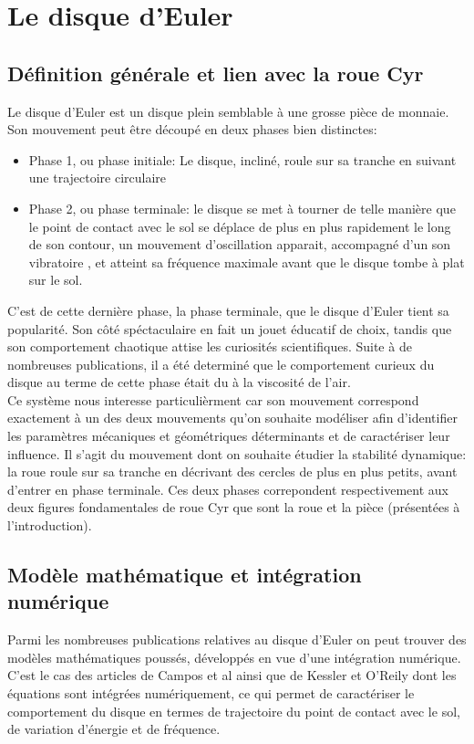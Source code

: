 \label{sec:RevLitt}

\section{Le disque d'Euler}
\subsection{Définition générale et lien avec la roue Cyr}
Le disque d'Euler est un disque plein semblable à une grosse pièce de monnaie. Son mouvement peut être découpé en deux phases bien distinctes:
\begin{itemize}
\item Phase 1, ou phase initiale: Le disque, incliné, roule sur sa tranche en suivant une trajectoire circulaire
\item Phase 2, ou phase terminale: le disque se met à tourner de telle manière que le point de contact avec le sol se déplace de plus en plus rapidement le long de son contour, un mouvement d'oscillation apparait, accompagné d'un son vibratoire \cite{ringing}, et atteint sa fréquence maximale avant que le disque tombe à plat sur le sol.
\end{itemize}

C'est de cette dernière phase, la phase terminale, que le disque d'Euler tient sa popularité. Son côté spéctaculaire en fait un jouet éducatif de choix, tandis que son comportement chaotique attise les curiosités scientifiques. Suite à de nombreuses publications, il a été determiné que le comportement curieux du disque au terme de cette phase était du à la viscosité de l'air.\\

Ce système nous interesse particulièrment car son mouvement correspond exactement à un des deux mouvements qu'on souhaite modéliser afin d'identifier les paramètres mécaniques et géométriques déterminants et de caractériser leur influence. Il s'agit du mouvement dont on souhaite étudier la stabilité dynamique: la roue roule sur sa tranche en décrivant des cercles de plus en plus petits, avant d'entrer en phase terminale. Ces deux phases correpondent respectivement aux deux figures fondamentales de roue Cyr que sont la roue et la pièce (présentées à l'introduction). 


\subsection{Modèle mathématique et intégration numérique}
Parmi les nombreuses publications relatives au disque d'Euler on peut trouver des modèles mathématiques poussés, développés en vue d'une intégration numérique. C'est le cas des articles de Campos et al \cite{campos} ainsi que de Kessler et O'Reily \cite{ringing} dont les équations sont intégrées numériquement, ce qui permet de caractériser le comportement du disque en termes de trajectoire du point de contact avec le sol, de variation d'énergie et de fréquence. 

